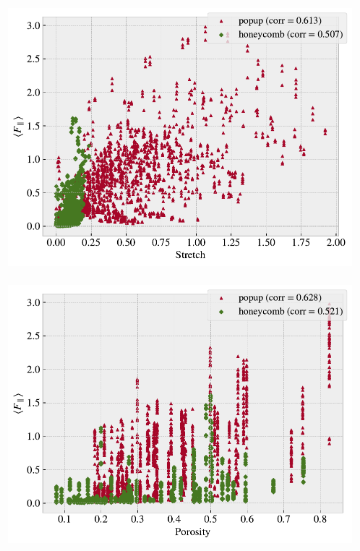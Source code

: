 \begin{figure}[H]
  \centering
  \begin{subfigure}[t]{0.32\textwidth}
      \centering
      \includegraphics[width=\textwidth]{figures/ML/corr_stretch_Ff.pdf}
      \caption{}
  \end{subfigure}
  \hfill
  \begin{subfigure}[t]{0.32\textwidth}
      \centering
      \includegraphics[width=\textwidth]{figures/ML/corr_porosity_Ff.pdf}
      \caption{}
  \end{subfigure}
  \hfill
  \begin{subfigure}[t]{0.32\textwidth}
      \centering

\end{subfigure}
\end{figure}
